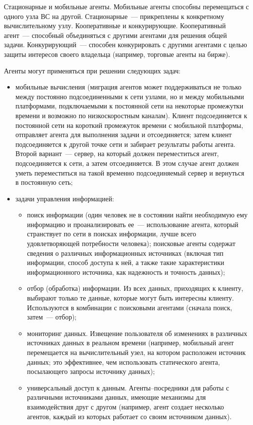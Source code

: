Стационарные и мобильные агенты. Мобильные агенты способны перемещаться с одного узла ВС на другой. Стационарные~--- прикреплены к конкретному вычислительному узлу.
Кооперативные и конкурирующие. Кооперативный агент~--- способный объединяться с другими агентами для решения общей задачи. Конкурирующий~--- способен конкурировать с другими агентами с целью защиты интересов своего владельца (например, торговые агенты на бирже).

Агенты могут применяться при решении следующих задач:
\begin{itemize}
\item мобильные вычисления (миграция агентов может поддерживаться не только между постоянно подсоединенными к сети узлами, но и между мобильными платформами, подключаемыми к постоянной сети на некоторые промежутки времени и возможно по низкоскоростным каналам). Клиент подсоединяется к постоянной сети на короткий промежуток времени с мобильной платформы, отправляет агента для выполнения задачи и отсоединяется; затем клиент подсоединяется к другой точке сети и забирает результаты работы агента. Второй вариант~--- сервер, на который должен переместиться агент, подсоединяется к сети, а затем отсоединяется. В этом случае агент должен уметь переместиться на такой временно подсоединяемый сервер и вернуться в постоянную сеть;
\item задачи управления информацией:
\begin{itemize}
\item поиск информации (один человек не в состоянии найти необходимую ему информацию и проанализировать ее~--- использование агента, который странствует по сети в поисках информации, лучше всего удовлетворяющей потребности человека); поисковые агенты содержат сведения о различных информационных источниках (включая тип информации, способ доступа к ней, а также такие характеристики информационного источника, как надежность и точность данных);
\item отбор (обработка) информации. Из всех данных, приходящих к клиенту, выбирают только те данные, которые могут быть интересны клиенту. Используются в комбинации с поисковыми агентами (сначала поиск, затем~--- отбор);
\item мониторинг данных. Извещение пользователя об изменениях в различных источниках данных в реальном времени (например, мобильный агент перемещается на вычислительный узел, на котором расположен источник данных; это эффективнее, чем использовать статического агента, посылающего запросы источнику данных);
\item универсальный доступ к данным. Агенты–посредники для работы с различными источниками данных, имеющие механизмы для взаимодействия друг с другом (например, агент создает несколько агентов, каждый из которых работает со своим источником данных).
\end{itemize}
\end{itemize}

